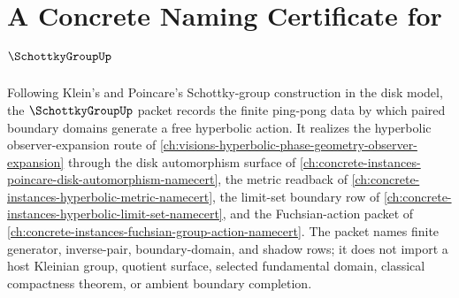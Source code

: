 \chapter{A Concrete Naming Certificate for $\SchottkyGroupUp$}
\label{ch:concrete-instances-schottky-group-namecert}

Following Klein's and Poincare's Schottky-group construction in the disk model, the $\SchottkyGroupUp$ packet records the finite ping-pong data by which paired boundary domains generate a free hyperbolic action. It realizes the hyperbolic observer-expansion route of \autoref{ch:visions-hyperbolic-phase-geometry-observer-expansion} through the disk automorphism surface of \autoref{ch:concrete-instances-poincare-disk-automorphism-namecert}, the metric readback of \autoref{ch:concrete-instances-hyperbolic-metric-namecert}, the limit-set boundary row of \autoref{ch:concrete-instances-hyperbolic-limit-set-namecert}, and the Fuchsian-action packet of \autoref{ch:concrete-instances-fuchsian-group-action-namecert}. The packet names finite generator, inverse-pair, boundary-domain, and shadow rows; it does not import a host Kleinian group, quotient surface, selected fundamental domain, classical compactness theorem, or ambient boundary completion.

